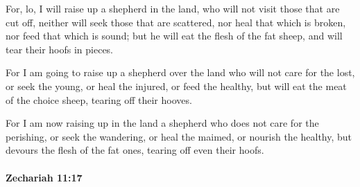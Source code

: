 			\begin{versebox}
					\item[BHS] 
					\item[LXX] 
					\item[ASV] For, lo, I will raise up a shepherd in the land, who will not visit those that are cut off, neither will seek those that are scattered, nor heal that which is broken, nor feed that which is sound; but he will eat the flesh of the fat sheep, and will tear their hoofs in pieces.
					\item[NIV] For I am going to raise up a shepherd over the land who will not care for the lost, or seek the young, or heal the injured, or feed the healthy, but will eat the meat of the choice sheep, tearing off their hooves.
					\item[NRSV] For I am now raising up in the land a shepherd who does not care for the perishing, or seek the wandering, or heal the maimed, or nourish the healthy, but devours the flesh of the fat ones, tearing off even their hoofs.
			\end{versebox}

		\paragraph{Zechariah 11:17} %
			\label{ZECHARIAH-11-17}

